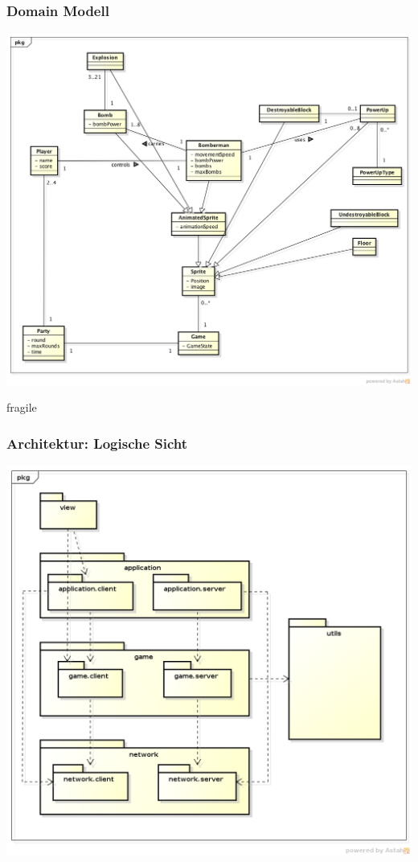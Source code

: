 \documentclass[10pt, compress]{beamer}
\begin{document}
\begin{frame}[fragile]
  \frametitle{Domain Modell}
	\begin{center}
	\includegraphics[scale=0.25]{Strukturdiagramm_JBomberman}
	\end{center}
\end{frame}

\begin{frame}{fragile}
  \frametitle{Architektur: Logische Sicht}
	\begin{center}
	\includegraphics[scale=0.3]{LogischeSicht}
	\end{center}
\end{frame}
\end{document}
